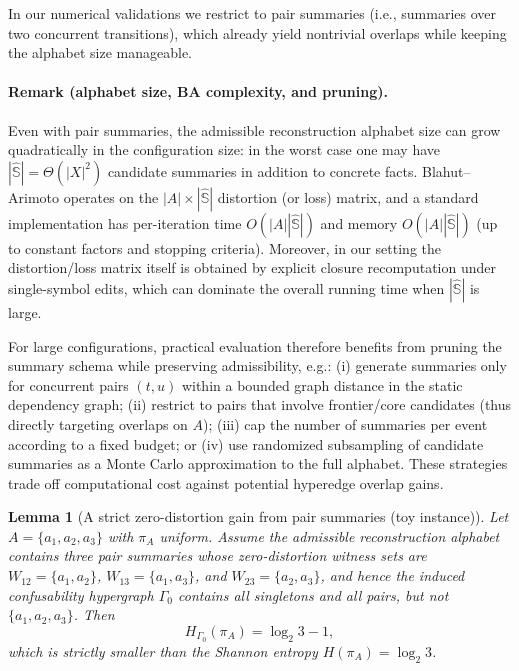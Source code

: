 \documentclass[twoside]{article}
\newtheorem{lemma}[theorem]{Lemma}
\newcommand{\1}{\mathbf{1}}
\begin{document}
In our numerical validations we restrict to pair summaries (i.e., summaries over two concurrent transitions), which already yield nontrivial overlaps while keeping the alphabet size manageable.

\paragraph{Remark (alphabet size, BA complexity, and pruning).}
Even with pair summaries, the admissible reconstruction alphabet size can grow quadratically in the configuration size:
in the worst case one may have \(|\hat{\mathbb S}|=\Theta(|X|^2)\) candidate summaries in addition to concrete facts.
Blahut--Arimoto operates on the \(|A|\times|\hat{\mathbb S}|\) distortion (or loss) matrix, and a standard implementation has
per-iteration time \(O(|A||\hat{\mathbb S}|)\) and memory \(O(|A||\hat{\mathbb S}|)\) (up to constant factors and stopping criteria).
Moreover, in our setting the distortion/loss matrix itself is obtained by explicit closure recomputation under single-symbol edits, which can
dominate the overall running time when \(|\hat{\mathbb S}|\) is large.

For large configurations, practical evaluation therefore benefits from pruning the summary schema while preserving admissibility, e.g.:
(i) generate summaries only for concurrent pairs \((t,u)\) within a bounded graph distance in the static dependency graph;
(ii) restrict to pairs that involve frontier/core candidates (thus directly targeting overlaps on \(A\));
(iii) cap the number of summaries per event according to a fixed budget; or
(iv) use randomized subsampling of candidate summaries as a Monte Carlo approximation to the full alphabet.
These strategies trade off computational cost against potential hyperedge overlap gains.


\begin{lemma}[A strict zero-distortion gain from pair summaries (toy instance)]
\label{lem:pair-summary-gain-toy}
Let \(A=\{a_1,a_2,a_3\}\) with \(\pi_A\) uniform.
Assume the admissible reconstruction alphabet contains three pair summaries whose zero-distortion witness sets are
\(W_{12}=\{a_1,a_2\}\), \(W_{13}=\{a_1,a_3\}\), and \(W_{23}=\{a_2,a_3\}\), and hence the induced confusability hypergraph
\(\Gamma_0\) contains all singletons and all pairs, but not \(\{a_1,a_2,a_3\}\).
Then
\[
H_{\Gamma_0}(\pi_A)=\log_2 3 - 1,
\]
which is strictly smaller than the Shannon entropy \(H(\pi_A)=\log_2 3\).
\end{lemma}
\end{document}
